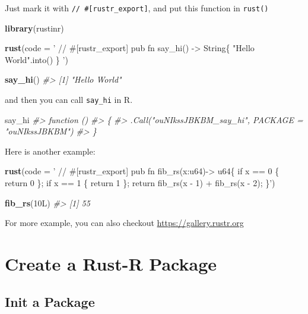 \documentclass[]{book}
\newenvironment{Shaded}{\begin{snugshade}}{\end{snugshade}}
\newcommand{\KeywordTok}[1]{\textcolor[rgb]{0.13,0.29,0.53}{\textbf{{#1}}}}
\newcommand{\DataTypeTok}[1]{\textcolor[rgb]{0.13,0.29,0.53}{{#1}}}
\newcommand{\StringTok}[1]{\textcolor[rgb]{0.31,0.60,0.02}{{#1}}}
\newcommand{\CommentTok}[1]{\textcolor[rgb]{0.56,0.35,0.01}{\textit{{#1}}}}
\newcommand{\NormalTok}[1]{{#1}}
\begin{document}
Just mark it with \texttt{//\ \#{[}rustr\_export{]}}, and put this
function in \texttt{rust()}

\begin{Shaded}
\begin{Highlighting}[]
\KeywordTok{library}\NormalTok{(rustinr)}

\KeywordTok{rust}\NormalTok{(}\DataTypeTok{code =} \StringTok{'}
\StringTok{// #[rustr_export]}
\StringTok{pub fn say_hi() -> String\{}
\StringTok{    "Hello World".into()}
\StringTok{\}}
\StringTok{'}\NormalTok{)}

\KeywordTok{say_hi}\NormalTok{()}
\CommentTok{#> [1] "Hello World"}
\end{Highlighting}
\end{Shaded}

and then you can call \texttt{say\_hi} in R.

\begin{Shaded}
\begin{Highlighting}[]
\NormalTok{say_hi}
\CommentTok{#> function () }
\CommentTok{#> \{}
\CommentTok{#>     .Call("ouNIkssJBKBM_say_hi", PACKAGE = "ouNIkssJBKBM")}
\CommentTok{#> \}}
\end{Highlighting}
\end{Shaded}

Here is another example:

\begin{Shaded}
\begin{Highlighting}[]
\KeywordTok{rust}\NormalTok{(}\DataTypeTok{code =} \StringTok{'}
\StringTok{// #[rustr_export]}
\StringTok{pub fn fib_rs(x:u64)-> u64\{}
\StringTok{    if x == 0 \{ return 0 \};}
\StringTok{    if x == 1 \{ return 1 \};}
\StringTok{    return fib_rs(x - 1) + fib_rs(x - 2);}
\StringTok{\}'}\NormalTok{)}

\KeywordTok{fib_rs}\NormalTok{(10L)}
\CommentTok{#> [1] 55}
\end{Highlighting}
\end{Shaded}

For more example, you can also checkout \url{https://gallery.rustr.org}

\section{Create a Rust-R Package}\label{create-a-rust-r-package}

\subsection{Init a Package}\label{init-a-package}
\end{document}
